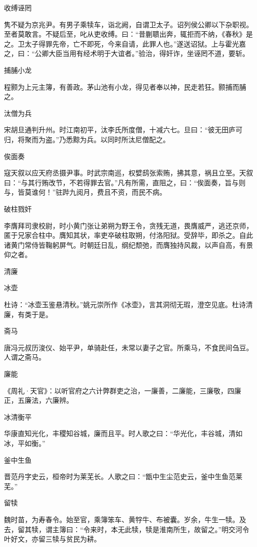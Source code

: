 \documentclass[a4paper,12pt,UTF8,twoside]{ctexbook}
\begin{document}
    收缚诬罔
    
    隽不疑为京兆尹。有男子乘犊车，诣北阙，自谓卫太子。诏列侯公卿以下杂职视。至者莫敢言。不疑后至，叱从吏收缚。曰：“昔蒯聩出奔，辄拒而不纳，《春秋》是之。卫太子得罪先帝，亡不即死，今来自请，此罪人也。”遂送诏狱。上与霍光嘉之，曰：“公卿大臣当用有经术明于大谊者。”验治，得奸诈，坐诬罔不道，要斩。
    
    捕脯小龙
    
    程颢为上元主簿，有善政。茅山池有小龙，得见者奉以神，民走若狂。颢捕而脯之。
    
    汰僧为兵
    
    宋胡旦通判升州。时江南初平，汰李氏所度僧，十减六七。旦曰：“彼无田庐可归，将聚而为盗。”乃悉黥为兵。以同时所汰尼僧配之。
    
    俟面奏
    
    寇天叙以应天府丞摄尹事。时武宗南巡，权嬖鸱张索贿，拂其意，祸且立至。天叙曰：“与其行贿改节，不若得罪去官。”凡有所需，直阻之，曰：“俟面奏，旨与则与，皆莫谁何！”驻跸九阅月，费且不资，而民不病。
    
    破柱戮奸
    
    李膺拜司隶校尉，时小黄门张让弟朔为野王令，贪残无道，畏膺威严，逃还京师，匿于兄家合柱中。膺知其状，率吏卒破柱取朔，付洛阳狱。受辞毕，即杀之。自此诸黄门常侍皆鞠躬屏气。时朝廷日乱，纲纪颓弛，而膺独持风裁，以声自高，有景仰之者。
    
    清廉
    
    冰壶
    
    杜诗：“冰壶玉鉴悬清秋。”姚元崇所作《冰壶》，言其洞彻无瑕，澄空见底。杜诗清廉，有类于是。
    
    斋马
    
    唐冯元叔历浚仪、始平尹，单骑赴任，未常以妻子之官。所乘马，不食民间刍豆。人谓之斋马。
    
    廉能
    
    《周礼·天官》：以听官府之六计弊群吏之治，一廉善，二廉能，三廉敬，四廉正，五廉法，六廉辨。
    
    冰清衡平
    
    华康直知光化，丰稷知谷城，廉而且平。时人歌之曰：“华光化，丰谷城，清如冰，平如衡。”
    
    釜中生鱼
    
    晋范丹字史云，桓帝时为莱芜长。人歌之曰：“甑中生尘范史云，釜中生鱼范莱芜。”
    
    留犊
    
    魏时苗，为寿春令。始至官，乘簿笨车、黄牸牛、布被囊。岁余，牛生一犊。及去，留其犊，谓主簿曰：“令来时，本无此犊，犊是淮南所生，故留之。”明交河令叶好文，亦留三犊与贫民为耕。
    
\end{document}
